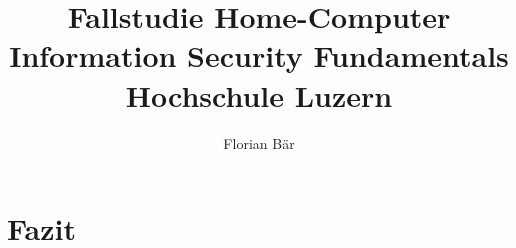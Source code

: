\documentclass{article}
\begin{document}
\title{%
	Fallstudie Home-Computer \\
	\large Information Security Fundamentals \\
	Hochschule Luzern}

\author{Florian Bär}
\maketitle
\thispagestyle{empty}
\clearpage
\setcounter{page}{1}

\tableofcontents



\newpage










\section{Fazit}
\end{document}
